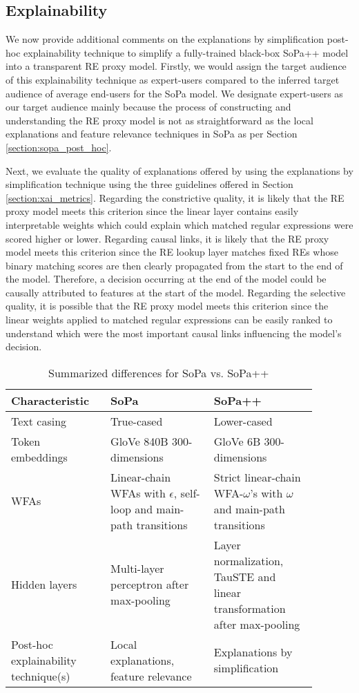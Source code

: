 \subsection{Explainability}

We now provide additional comments on the explanations by simplification
post-hoc explainability technique to simplify a fully-trained black-box SoPa++
model into a transparent RE proxy model. Firstly, we would assign the target
audience of this explainability technique as expert-users compared to the
inferred target audience of average end-users for the SoPa model. We designate
expert-users as our target audience mainly because the process of constructing
and understanding the RE proxy model is not as straightforward as the local
explanations and feature relevance techniques in SoPa as per Section
\ref{section:sopa_post_hoc}.

Next, we evaluate the quality of explanations offered by using the explanations
by simplification technique using the three guidelines offered in Section
\ref{section:xai_metrics}. Regarding the constrictive quality, it is likely that
the RE proxy model meets this criterion since the linear layer contains easily
interpretable weights which could explain which matched regular expressions were
scored higher or lower. Regarding causal links, it is likely that the RE proxy
model meets this criterion since the RE lookup layer matches fixed REs whose
binary matching scores are then clearly propagated from the start to the end of
the model. Therefore, a decision occurring at the end of the model could be
causally attributed to features at the start of the model. Regarding the selective
quality, it is possible that the RE proxy model meets this criterion since the
linear weights applied to matched regular expressions can be easily ranked to
understand which were the most important causal links influencing the model's
decision.

\begin{table}[t!]
  \centering {}
  \begin{tabular}{L{0.275\linewidth} L{0.3\linewidth} L{0.3\linewidth}}
    \toprule
    Characteristic & SoPa & SoPa++ \\
    \midrule
    Text casing & True-cased & Lower-cased \\ 
    Token embeddings & GloVe 840B 300-dimensions & GloVe 6B 300-dimensions \\
    WFAs & Linear-chain WFAs with $\epsilon$, self-loop and main-path transitions & Strict linear-chain WFA-$\omega$'s with $\omega$ and main-path transitions \\
    Hidden layers & Multi-layer perceptron after max-pooling & Layer normalization, TauSTE and linear transformation after max-pooling \\
    Post-hoc explainability technique(s) & Local explanations, feature relevance & Explanations by simplification \\
    \bottomrule
  \end{tabular}
  \caption{Summarized differences for SoPa vs. SoPa++}
  \label{tab:sopa_spp_comparison}
\end{table}

